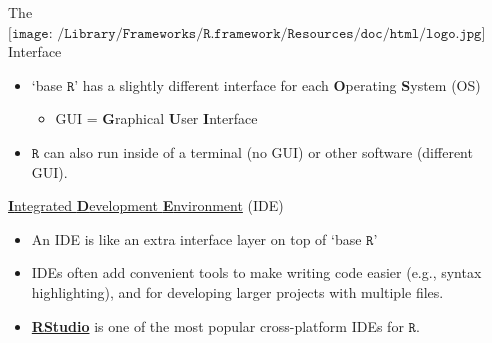 \documentclass[
  ignorenonframetext,
]{beamer}
\providecommand{\tightlist}{%
  \setlength{\itemsep}{0pt}\setlength{\parskip}{0pt}}
\begin{document}
\begin{frame}{The
\(\texttt{[image: /Library/Frameworks/R.framework/Resources/doc/html/logo.jpg]}\)
Interface}
\protect\hypertarget{the-includegraphicsheight1emlibraryframeworksr.frameworkresourcesdochtmllogo.jpg-interface}{}
\begin{itemize}
\tightlist
\item
  `base \(\texttt{R}\)' has a slightly different interface for each
  \textbf{O}perating \textbf{S}ystem (OS)

  \begin{itemize}
  \tightlist
  \item
    GUI = \textbf{G}raphical \textbf{U}ser \textbf{I}nterface
  \end{itemize}
\item
  \(\texttt{R}\) can also run inside of a terminal (no GUI) or other
  software (different GUI).
\end{itemize}

\begin{block}{\href{https://en.wikipedia.org/wiki/Integrated_development_environment}{\textbf{I}ntegrated
\textbf{D}evelopment \textbf{E}nvironment} (IDE)}
\protect\hypertarget{integrated-development-environment-ide}{}
\begin{itemize}
\tightlist
\item
  An IDE is like an extra interface layer on top of `base
  \(\texttt{R}\)'
\item
  IDEs often add convenient tools to make writing code easier (e.g.,
  syntax highlighting), and for developing larger projects with multiple
  files.
\item
  \textbf{\href{https://posit.co/products/open-source/rstudio/}{RStudio}}
  is one of the most popular cross-platform IDEs for \(\texttt{R}\).

\end{itemize}
\end{block}
\end{frame}
\end{document}

